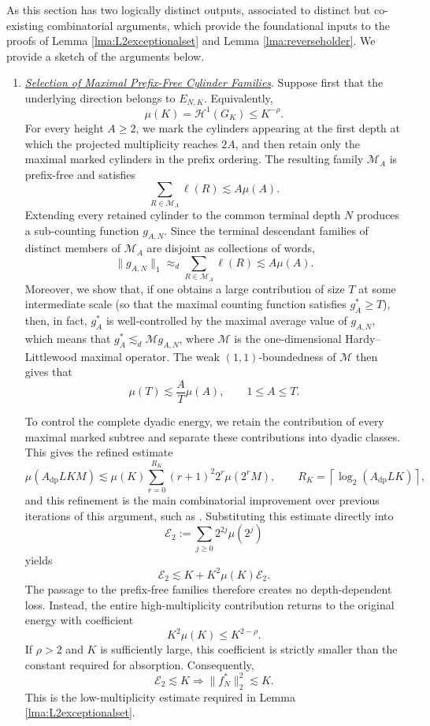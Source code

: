 \documentclass[12pt]{amsart}
\numberwithin{equation}{section}
\newcommand{\cM}{\mathcal{M}}
\begin{document}
As this section has two logically distinct outputs, associated to distinct but co-existing combinatorial arguments, which provide the
foundational inputs to the proofs of Lemma \ref{lma:L2exceptionalset} and
Lemma \ref{lma:reverseholder}. We provide a sketch of the arguments below.

\begin{enumerate}[leftmargin=*,labelindent=0pt]
    \item \underline{\textit{Selection of Maximal Prefix-Free Cylinder
    Families}}. Suppose first that the underlying direction belongs to
    $E_{N,K}$.  Equivalently,
    \[
        \mu(K)=\mathcal H^1(G_K)\leq K^{-\rho}.
    \]
    For every height $A\geq2$, we mark the cylinders appearing at the first
    depth at which the projected multiplicity reaches $2A$, and then retain
    only the maximal marked cylinders in the prefix ordering.  The resulting
    family $\mathscr M_A$ is prefix-free and satisfies
    \[
        \sum_{R\in\mathscr M_A}\ell(R)\lesssim A\mu(A).
    \]
    Extending every retained cylinder to the common terminal depth $N$
    produces a sub-counting function $g_{A,N}$.  Since the terminal descendant
    families of distinct members of $\mathscr M_A$ are disjoint as collections
    of words,
    \[
        \|g_{A,N}\|_1
        \approx_d \sum_{R\in\mathscr M_A}\ell(R)
        \lesssim A\mu(A).
    \]
    Moreover, we show that, if one obtains a large contribution of size $T$ at some intermediate scale (so that the maximal counting function satisfies $g_A^* \geq T$), then, in fact, $g_A^*$ is well-controlled by the maximal average value of $g_{A,N}$, which means that
    $g_A^*\lesssim_d\cM g_{A,N}$,
    where $\cM$ is the one-dimensional Hardy--Littlewood maximal operator.
    The weak $(1,1)$-boundedness of $\mathcal{M}$ then gives that
    \[
        \mu(T)\lesssim\frac{A}{T}\mu(A),
        \qquad 1\leq A\leq T.
    \]

    To control the complete dyadic energy, we retain the contribution of every
    maximal marked subtree and separate these contributions into dyadic
    classes.  This gives the refined estimate
    \[
        \mu(A_{\mathrm{dp}}LKM)
        \lesssim
        \mu(K)\sum_{r=0}^{R_K}
        (r+1)^2 2^r\mu(2^rM),
        \qquad
        R_K=\left\lceil\log_2(A_{\mathrm{dp}}LK)\right\rceil,
    \]
    and this refinement is the main combinatorial improvement over previous iterations of this argument, such as \cite{BV,BLV,NPV}.
    Substituting this estimate directly into
    \[
        \mathcal E_2:=\sum_{j\geq0}2^{2j}\mu(2^j)
    \]
    yields
    \[
        \mathcal E_2
        \lesssim K+K^2\mu(K)\mathcal E_2.
    \]
    The passage to the prefix-free families therefore creates no
    depth-dependent loss.  Instead, the entire high-multiplicity contribution
    returns to the original energy with coefficient
    \[
        K^2\mu(K)\leq K^{2-\rho}.
    \]
    If $\rho>2$ and $K$ is sufficiently large, this coefficient is strictly
    smaller than the constant required for absorption.  Consequently,
    \[
        \mathcal E_2\lesssim K \Longrightarrow 
        \|f_N^*\|_2^2\lesssim K.
    \]
    This is the low-multiplicity estimate required in Lemma
    \ref{lma:L2exceptionalset}.


\end{enumerate}
\end{document}
